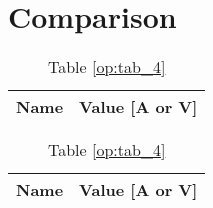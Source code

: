 \section{Comparison}
\label{sec:comparison}

\begin{table}
\parbox{.45\linewidth}{
\centering
                        

\centering                                  %
                        
\def\arraystretch{1}                       %

\begin{tabular}{c|c}                    %
\hline                                  %

\textbf{Name}  & \textbf{Value [A or V]}\\     

\hline                                %

\hline                                %
\end{tabular}

\caption{Table \ref{tab2}}
\label{tab7}
}
\hfill
\parbox{.45\linewidth}{
\centering

  \centering
  \def\arraystretch{1}
 
\begin{tabular}{c|c}
    \hline    
    \textbf{Name} & \textbf{Value [A or V]} \\ \hline
    
    \hline
  \end{tabular}
  \captionsetup{justification=centering, margin=2cm}
  \caption{Table \ref{op:tab_4}}
  \label{tab8}
}
\end{table}
\FloatBarrier


